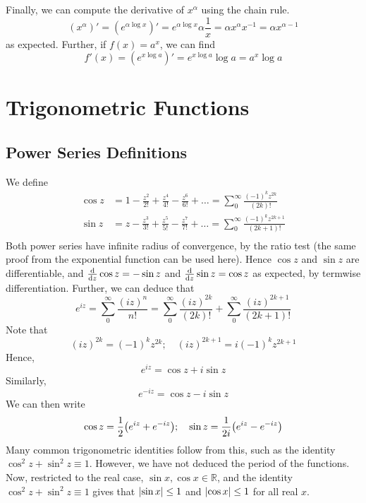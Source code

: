 \documentclass{article}
\begin{document}
Finally, we can compute the derivative of $x^\alpha$ using the chain rule.
\[ (x^\alpha)' = \left( e^{\alpha \log x} \right)' = e^{\alpha \log x} \alpha \frac{1}{x} = \alpha x^\alpha x^{-1} = \alpha x^{\alpha - 1} \]
as expected. Further, if $f(x) = a^x$, we can find
\[ f'(x) = \left( e^{x \log a} \right)' = e^{x \log a} \log a = a^x \log a \]

\section{Trigonometric Functions}
\subsection{Power Series Definitions}
We define
\begin{align*}
	\cos z & = 1 - \frac{z^2}{2!} + \frac{z^4}{4!} - \frac{z^6}{6!} + \dots = \sum_0^\infty \frac{(-1)^k z^{2k}}{(2k)!}     \\
	\sin z & = z - \frac{z^3}{3!} + \frac{z^5}{5!} - \frac{z^7}{7!} + \dots = \sum_0^\infty \frac{(-1)^k z^{2k+1}}{(2k+1)!} \\
\end{align*}
Both power series have infinite radius of convergence, by the ratio test (the same proof from the exponential function can be used here). Hence $\cos z$ and $\sin z$ are differentiable, and $\dv{z}\cos z = -\sin z$ and $\dv{z}\sin z = \cos z$ as expected, by termwise differentiation. Further, we can deduce that
\[ e^{iz} = \sum_0^\infty \frac{(iz)^n}{n!} = \sum_0^\infty \frac{(iz)^{2k}}{(2k)!} + \sum_0^\infty \frac{(iz)^{2k+1}}{(2k+1)!} \]
Note that
\[ (iz)^{2k} = (-1)^k z^{2k};\quad (iz)^{2k+1} = i (-1)^k z^{2k+1} \]
Hence,
\[ e^{iz} = \cos z + i \sin z \]
Similarly,
\[ e^{-iz} = \cos z - i \sin z \]
We can then write
\[ \cos z = \frac{1}{2}\qty( e^{iz} + e^{-iz} );\quad \sin z = \frac{1}{2i}\qty( e^{iz} - e^{-iz} ) \]
Many common trigonometric identities follow from this, such as the identity $\cos^2 z + \sin^2 z \equiv 1$. However, we have not deduced the period of the functions. Now, restricted to the real case, $\sin x, \cos x \in \mathbb R$, and the identity $\cos^2 z + \sin^2 z \equiv 1$ gives that $\abs{\sin x} \leq 1$ and $\abs{\cos x} \leq 1$ for all real $x$.
\end{document}
